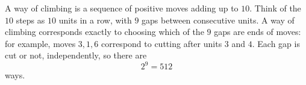 A way of climbing is a sequence of positive moves adding up to $10$. Think of the $10$ steps as $10$ units in a row, with $9$ gaps between consecutive units. A way of climbing corresponds exactly to choosing which of the $9$ gaps are ends of moves: for example, moves $3,1,6$ correspond to cutting after units $3$ and $4$. Each gap is cut or not, independently, so there are
\[2^9=\boxed{512}\]
ways.
